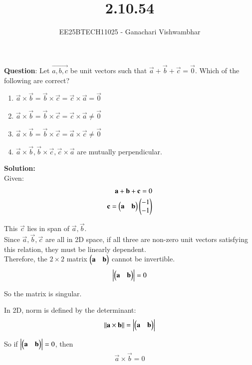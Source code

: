 \documentclass[journal]{IEEEtran}
\begin{document}
\title{2.10.54}
\author{EE25BTECH11025 - Ganachari Vishwambhar}
\maketitle

\textbf{Question}:\newline
Let $\vec{a, b,c}$ be unit vectors such that $\vec{a}+\vec{b}+\vec{c}=\vec{0}$. Which of the following are correct?\\
\begin{enumerate}
    \item $\vec{a}\times \vec{b}=\vec{b}\times \vec{c}=\vec{c}\times \vec{a}=\vec{0}$
    \item $\vec{a}\times \vec{b}=\vec{b}\times \vec{c}=\vec{c}\times \vec{a}\neq \vec{0}$
    \item $\vec{a}\times \vec{b}=\vec{b}\times \vec{c}=\vec{a}\times \vec{c}\neq \vec{0}$
    \item $\vec{a}\times \vec{b},\vec{b}\times \vec{c}, \vec{c}\times \vec{a}$ are mutually perpendicular.
\end{enumerate}
\textbf{Solution: }\\

Given:
\begin{align}
    \mathbf{a}+\mathbf{b}+\mathbf{c}=0\\
    \mathbf{c}= \begin{pmatrix}\mathbf{a}&\mathbf{b}\end{pmatrix}\begin{pmatrix}-1\\-1\end{pmatrix}\\
\end{align}

This $\vec{c}$ lies in span of $\vec{a}, \vec{b}$.\\

Since $\vec{a}, \vec{b}, \vec{c}$ are all in 2D space, if all three are non-zero unit vectors satisfying this relation, they must be linearly dependent.\\

Therefore, the $2\times2$ matrix $\begin{pmatrix}\mathbf{a}&\mathbf{b}\end{pmatrix}$ cannot be invertible.
\begin{align}
    \mdet{\myvec{\vec{a}&\vec{b}}}=0
\end{align}

So the matrix is singular.

In 2D, norm is defined by the determinant:
\begin{align}
    ||\vec{a}\times\vec{b}||=\mdet{\myvec{\vec{a}&\vec{b}}}
\end{align}

So if $\mdet{\myvec{\vec{a}&\vec{b}}}=0$, then
\begin{align}
    \vec{a}\times\vec{b}=0
\end{align}
\end{document}

